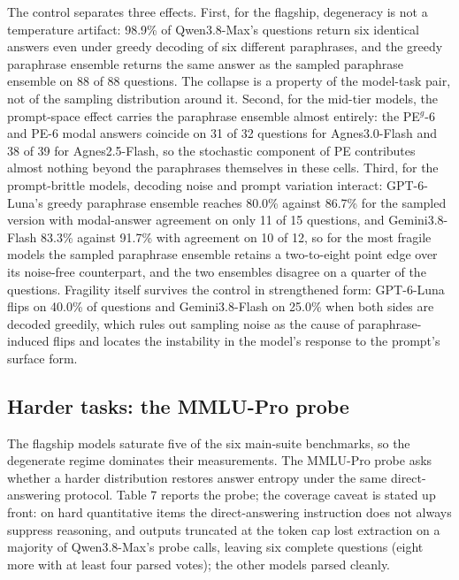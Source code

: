 \documentclass[preprint,12pt]{elsarticle}
\begin{document}
The control separates three effects. First, for the flagship, degeneracy is not a temperature artifact: 98.9\% of Qwen3.8-Max's questions return six identical answers even under greedy decoding of six different paraphrases, and the greedy paraphrase ensemble returns the same answer as the sampled paraphrase ensemble on 88 of 88 questions. The collapse is a property of the model-task pair, not of the sampling distribution around it. Second, for the mid-tier models, the prompt-space effect carries the paraphrase ensemble almost entirely: the PE$^{g}$-6 and PE-6 modal answers coincide on 31 of 32 questions for Agnes3.0-Flash and 38 of 39 for Agnes2.5-Flash, so the stochastic component of PE contributes almost nothing beyond the paraphrases themselves in these cells. Third, for the prompt-brittle models, decoding noise and prompt variation interact: GPT-6-Luna's greedy paraphrase ensemble reaches 80.0\% against 86.7\% for the sampled version with modal-answer agreement on only 11 of 15 questions, and Gemini3.8-Flash 83.3\% against 91.7\% with agreement on 10 of 12, so for the most fragile models the sampled paraphrase ensemble retains a two-to-eight point edge over its noise-free counterpart, and the two ensembles disagree on a quarter of the questions. Fragility itself survives the control in strengthened form: GPT-6-Luna flips on 40.0\% of questions and Gemini3.8-Flash on 25.0\% when both sides are decoded greedily, which rules out sampling noise as the cause of paraphrase-induced flips and locates the instability in the model's response to the prompt's surface form.

\subsection{Harder tasks: the MMLU-Pro probe}


The flagship models saturate five of the six main-suite benchmarks, so the degenerate regime dominates their measurements. The MMLU-Pro probe asks whether a harder distribution restores answer entropy under the same direct-answering protocol. Table 7 reports the probe; the coverage caveat is stated up front: on hard quantitative items the direct-answering instruction does not always suppress reasoning, and outputs truncated at the token cap lost extraction on a majority of Qwen3.8-Max's probe calls, leaving six complete questions (eight more with at least four parsed votes); the other models parsed cleanly.
\end{document}
